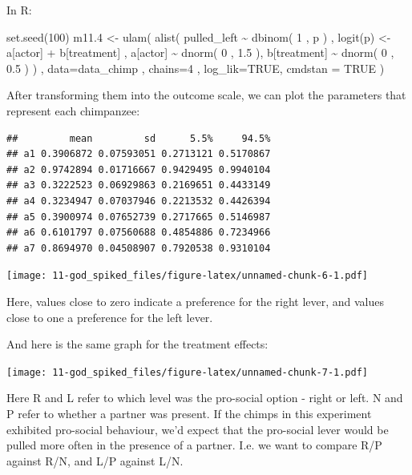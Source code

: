 \documentclass[
]{book}
\newenvironment{Shaded}{\begin{snugshade}}{\end{snugshade}}
\newcommand{\AttributeTok}[1]{\textcolor[rgb]{0.77,0.63,0.00}{#1}}
\newcommand{\ConstantTok}[1]{\textcolor[rgb]{0.00,0.00,0.00}{#1}}
\newcommand{\DecValTok}[1]{\textcolor[rgb]{0.00,0.00,0.81}{#1}}
\newcommand{\FloatTok}[1]{\textcolor[rgb]{0.00,0.00,0.81}{#1}}
\newcommand{\FunctionTok}[1]{\textcolor[rgb]{0.00,0.00,0.00}{#1}}
\newcommand{\NormalTok}[1]{#1}
\newcommand{\OtherTok}[1]{\textcolor[rgb]{0.56,0.35,0.01}{#1}}
\newcommand{\SpecialCharTok}[1]{\textcolor[rgb]{0.00,0.00,0.00}{#1}}
\begin{document}
In R:

\begin{Shaded}
\begin{Highlighting}[]
\FunctionTok{set.seed}\NormalTok{(}\DecValTok{100}\NormalTok{)}
\NormalTok{m11}\FloatTok{.4} \OtherTok{\textless{}{-}} \FunctionTok{ulam}\NormalTok{( }\FunctionTok{alist}\NormalTok{(}
\NormalTok{  pulled\_left }\SpecialCharTok{\textasciitilde{}} \FunctionTok{dbinom}\NormalTok{( }\DecValTok{1}\NormalTok{ , p ) , }
  \FunctionTok{logit}\NormalTok{(p) }\OtherTok{\textless{}{-}}\NormalTok{ a[actor] }\SpecialCharTok{+}\NormalTok{ b[treatment] , }
\NormalTok{  a[actor] }\SpecialCharTok{\textasciitilde{}} \FunctionTok{dnorm}\NormalTok{( }\DecValTok{0}\NormalTok{ , }\FloatTok{1.5}\NormalTok{ ), }
\NormalTok{  b[treatment] }\SpecialCharTok{\textasciitilde{}} \FunctionTok{dnorm}\NormalTok{( }\DecValTok{0}\NormalTok{ , }\FloatTok{0.5}\NormalTok{ )}
\NormalTok{) , }\AttributeTok{data=}\NormalTok{data\_chimp , }\AttributeTok{chains=}\DecValTok{4}\NormalTok{ , }\AttributeTok{log\_lik=}\ConstantTok{TRUE}\NormalTok{, }\AttributeTok{cmdstan =} \ConstantTok{TRUE}\NormalTok{ )}
\end{Highlighting}
\end{Shaded}

After transforming them into the outcome scale, we can plot the parameters that represent each chimpanzee:

\begin{verbatim}
##         mean         sd      5.5%     94.5%
## a1 0.3906872 0.07593051 0.2713121 0.5170867
## a2 0.9742894 0.01716667 0.9429495 0.9940104
## a3 0.3222523 0.06929863 0.2169651 0.4433149
## a4 0.3234947 0.07037946 0.2213532 0.4426394
## a5 0.3900974 0.07652739 0.2717665 0.5146987
## a6 0.6101797 0.07560688 0.4854886 0.7234966
## a7 0.8694970 0.04508907 0.7920538 0.9310104
\end{verbatim}

\texttt{[image: 11-god\_spiked\_files/figure-latex/unnamed-chunk-6-1.pdf]}

Here, values close to zero indicate a preference for the right lever, and values close to one a preference for the left lever.

And here is the same graph for the treatment effects:

\texttt{[image: 11-god\_spiked\_files/figure-latex/unnamed-chunk-7-1.pdf]}

Here R and L refer to which level was the pro-social option - right or left. N and P refer to whether a partner was present. If the chimps in this experiment exhibited pro-social behaviour, we'd expect that the pro-social lever would be pulled more often in the presence of a partner. I.e. we want to compare R/P against R/N, and L/P against L/N.
\end{document}
